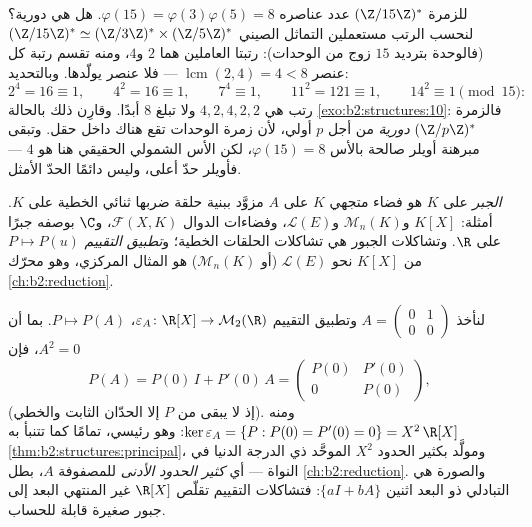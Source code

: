 \begin{example}\label{ex:b2:structures:units15}
للزمرة $(\Z/15\Z)^*$ عدد عناصره $\varphi(15) = \varphi(3)\varphi(5)
= 8$. هل هي دورية؟ لنحسب الرتب مستعملين التماثل
الصيني $(\Z/15\Z)^* \simeq (\Z/3\Z)^* \times (\Z/5\Z)^*$
(فالوحدة بترديد $15$ زوج من الوحدات): رتبتا العاملين هما
$2$ و$4$، ومنه تقسم رتبة كل عنصر
$\operatorname{lcm}(2, 4) = 4 < 8$ --- فلا عنصر يولّدها.
وبالتحديد:
\[
2^4 = 16 \equiv 1, \qquad
4^2 = 16 \equiv 1, \qquad
7^4 \equiv 1, \qquad
11^2 = 121 \equiv 1, \qquad
14^2 \equiv 1 \pmod{15} :
\]
رتب هي $4, 2, 4, 2, 2$ ولا تبلغ $8$ أبدًا. وقارِن ذلك بالحالة
\cref{exo:b2:structures:10}: فالزمرة $(\Z/p\Z)^*$ \emph{دورية} من أجل
$p$ أولي، لأن زمرة الوحدات تقع هناك داخل حقل.
وتبقى مبرهنة أويلر صالحة بالأس $\varphi(15) = 8$،
لكن الأس الشمولي الحقيقي هنا هو $4$ --- فأويلر حدّ
أعلى، وليس دائمًا الحدّ الأمثل.
\end{example}

\begin{definition}[الجبر]\label{def:b2:structures:algebra}
\emph{الجبر} على $K$ هو فضاء متجهي $K$ على $A$ مزوَّد
ببنية حلقة ضربها ثنائي الخطية على $K$. أمثلة:
$K[X]$ و$\mathcal{M}_n(K)$ و$\mathcal{L}(E)$، وفضاءات الدوال
$\mathcal{F}(X, K)$، و$\C$ بوصفه جبرًا على $\R$. وتشاكلات الجبور
هي تشاكلات الحلقات الخطية؛ و\emph{تطبيق التقييم} $P \mapsto P(u)$
من $K[X]$ نحو $\mathcal{L}(E)$ (أو $\mathcal{M}_n(K)$) هو المثال
المركزي، وهو محرّك \cref{ch:b2:reduction}.
\end{definition}

\begin{example}\label{ex:b2:structures:evaluation}
لنأخذ $A = \begin{pmatrix}0 & 1\\ 0 & 0\end{pmatrix}$ وتطبيق
التقييم $\varepsilon_A \colon \R[X] \to \mathcal{M}_2(\R)$،
$P \mapsto P(A)$. بما أن $A^2 = 0$، فإن
\[
P(A) = P(0)\,I + P'(0)\,A =
\begin{pmatrix} P(0) & P'(0)\\ 0 & P(0)\end{pmatrix},
\]
(إذ لا يبقى من $P$ إلا الحدّان الثابت والخطي). ومنه
$\ker\varepsilon_A = \{P : P(0) = P'(0) = 0\} = X^2\,\R[X]$: وهو
 رئيسي، تمامًا كما تتنبأ به \cref{thm:b2:structures:principal}، ومولَّد بكثير الحدود $X^2$
الموحَّد ذي الدرجة الدنيا في النواة --- أي \emph{كثير الحدود الأدنى}
للمصفوفة $A$، بطل \cref{ch:b2:reduction}. والصورة هي 
التبادلي ذو البعد اثنين $\{aI + bA\}$: فتشاكلات التقييم تقلّص
$\R[X]$ غير المنتهي البعد إلى جبور صغيرة قابلة للحساب.
\end{example}

